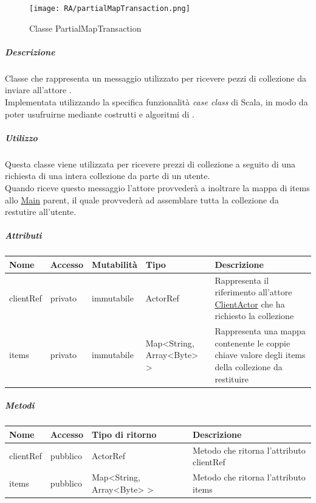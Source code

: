 \documentclass{scalatekids-article}
\begin{document}
\begin{figure}[H]
  \begin{center}
    \texttt{[image: RA/partialMapTransaction.png]}
    \caption{Classe PartialMapTransaction}
  \end{center}
\end{figure}

\subparagraph{Descrizione}
Classe che rappresenta un messaggio utilizzato per ricevere pezzi di collezione da inviare all'attore .\\Implementata utilizzando la specifica funzionalità \textit{case class} di Scala,
in modo da poter usufruirne mediante costrutti e algoritmi di
.

\subparagraph{Utilizzo}
Questa classe viene utilizzata per ricevere prezzi di collezione a seguito di
una richiesta di una intera collezione da parte di un utente.\\Quando riceve questo messaggio l'attore provvederà a inoltrare la mappa di items allo
\hyperref[sec:actorbase::actorsystem::actors::main::Main]{Main} parent, il quale provvederà ad assemblare tutta la collezione da restutire all'utente.

\subparagraph{Attributi}
\begin{tabular}{| p{2cm} | p{1.5cm} | p{2cm} | p{3cm} | p{8.5cm} |}
  \hline
  Nome & Accesso & Mutabilità & Tipo & Descrizione\\
  \hline
  clientRef & privato & immutabile & ActorRef & Rappresenta il riferimento all'attore \hyperref[sec:actorbase::actorsystem::actors::clientactor::ClientActor]{ClientActor} che ha richiesto la collezione\\
  \hline
  items & privato & immutabile & Map<String, Array<Byte> > & Rappresenta una mappa contenente le coppie chiave valore degli items della collezione da restituire\\
  \hline
\end{tabular}

\subparagraph{Metodi}
\begin{tabular}{| l | l | l | l |}
  \hline
  Nome & Accesso & Tipo di ritorno & Descrizione\\
  \hline
  clientRef & pubblico & ActorRef & Metodo che ritorna l'attributo clientRef\\
  \hline
  items & pubblico & Map<String, Array<Byte> > & Metodo che ritorna l'attributo items\\
  \hline
\end{tabular}
\end{document}
